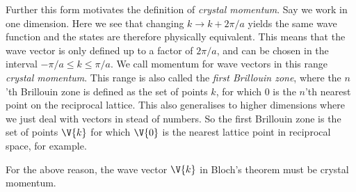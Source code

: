 \documentclass[main.tex]{subfiles}
\begin{document}
	Further this form motivates the definition of \textit{crystal momentum}. Say we work in one dimension. Here we see that changing $ k \to k + 2\pi/a $ yields the same wave function and the states are therefore physically equivalent. This means that the wave vector is only defined up to a factor of $ 2 \pi / a $, and can be chosen in the interval $ -\pi /a \leq k \leq \pi/a $. We call momentum for wave vectors in this range \textit{crystal momentum}. This range is also called the \textit{first Brillouin zone}, where the $ n $'th Brillouin zone is defined as the set of points $ k $, for which $ 0 $ is the $ n $'th nearest point on the reciprocal lattice. This also generalises to higher dimensions where we just deal with vectors in stead of numbers. So the first Brillouin zone is the set of points $ \V{k} $ for which $ \V{0} $ is the nearest lattice point in reciprocal space, for example.
	
	For the above reason, the wave vector $ \V{k} $ in Bloch's theorem must be crystal momentum.
	
	
	
\end{document}
